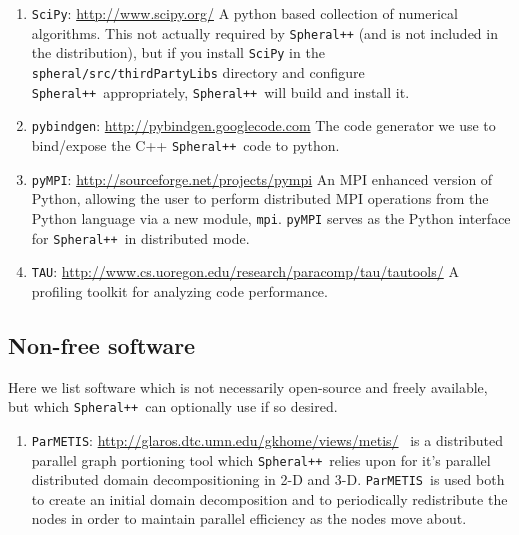 \documentclass{article}
\newcommand{\Spheral}{{\tt Spheral++}}
\begin{document}
\begin{enumerate}
\item \verb+SciPy+: \url{http://www.scipy.org/} \newline A python based
  collection of numerical algorithms.  This not actually required by \Spheral
  (and is not included in the distribution), but if you install {\tt SciPy} in
  the \verb+spheral/src/thirdPartyLibs+ directory and configure
  \Spheral\ appropriately, \Spheral\ will build and install it.

\item \verb+pybindgen+: \url{http://pybindgen.googlecode.com} \newline
  The code generator we use to bind/expose the C++ \Spheral\ code to python.

\item\verb+pyMPI+: \url{http://sourceforge.net/projects/pympi} \newline
An MPI enhanced version of Python, allowing the user to perform distributed MPI
operations from the Python language via a new module, \verb+mpi+.  \verb+pyMPI+
serves as the Python interface for \Spheral\ in distributed mode.

\item\verb+TAU+: \url{http://www.cs.uoregon.edu/research/paracomp/tau/tautools/}
\newline
A profiling toolkit for analyzing code performance.

\end{enumerate}

\subsection{Non-free software}
\label{nonfree.sec}
Here we list software which is not necessarily open-source and freely available,
but which \Spheral\ can optionally use if so desired.
\newcommand{\Parmetis}{{\tt ParMETIS}}
\begin{enumerate}
\item \Parmetis: \label{parmetis.item}
  \url{http://glaros.dtc.umn.edu/gkhome/views/metis/} \newline \Parmetis\ is a
  distributed parallel graph portioning tool which \Spheral\ relies upon for
  it's parallel distributed domain decompositioning in 2-D and 3-D.
  \Parmetis\ is used both to create an initial domain decomposition and to
  periodically redistribute the nodes in order to maintain parallel efficiency
  as the nodes move about.
\end{enumerate}
\end{document}
